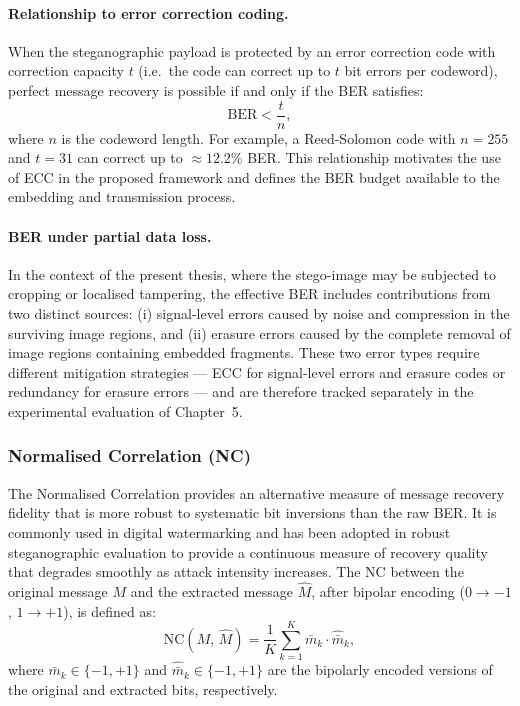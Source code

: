 \documentclass[12pt,a4paper,oneside]{report}
\begin{document}
	\paragraph{Relationship to error correction coding.}
	When the steganographic payload is protected by an error correction code with correction capacity
	$t$ (i.e.\ the code can correct up to $t$ bit errors per codeword), perfect message recovery is
	possible if and only if the BER satisfies:
	\begin{equation}
		\mathrm{BER} < \frac{t}{n},
		\label{eq:ber_ecc}
	\end{equation}
	where $n$ is the codeword length. For example, a Reed-Solomon code with $n = 255$ and
	$t = 31$ can correct up to $\approx 12.2\%$ BER. This relationship motivates the use of ECC
	in the proposed framework and defines the BER budget available to the embedding and transmission
	process.
	
	\paragraph{BER under partial data loss.}
	In the context of the present thesis, where the stego-image may be subjected to cropping or
	localised tampering, the effective BER includes contributions from two distinct sources: (i)
	signal-level errors caused by noise and compression in the surviving image regions, and (ii)
	erasure errors caused by the complete removal of image regions containing embedded fragments.
	These two error types require different mitigation strategies --- ECC for signal-level errors
	and erasure codes or redundancy for erasure errors --- and are therefore tracked separately
	in the experimental evaluation of Chapter~5.
	
	\subsubsection{Normalised Correlation (NC)}
	
	The Normalised Correlation provides an alternative measure of message recovery fidelity that is
	more robust to systematic bit inversions than the raw BER. It is commonly used in digital
	watermarking \cite{cox2007digital} and has been adopted in robust steganographic evaluation to
	provide a continuous measure of recovery quality that degrades smoothly as attack intensity
	increases. The NC between the original message $M$ and the extracted message $\hat{M}$, after
	bipolar encoding ($0 \to -1$, $1 \to +1$), is defined as:
	\begin{equation}
		\mathrm{NC}(M,\, \hat{M}) = \frac{1}{K}
		\sum_{k=1}^{K} \bar{m}_k \cdot \hat{\bar{m}}_k,
		\label{eq:nc}
	\end{equation}
	where $\bar{m}_k \in \{-1, +1\}$ and $\hat{\bar{m}}_k \in \{-1, +1\}$ are the bipolarly
	encoded versions of the original and extracted bits, respectively.
	
\end{document}
